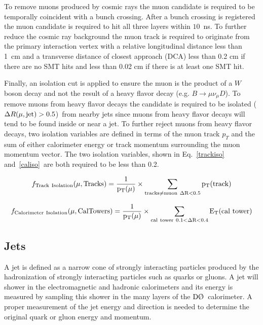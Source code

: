 To remove muons produced by cosmic rays the muon candidate is required to be temporally coincident with a bunch crossing. After a bunch crossing is registered the muon candidate is required to hit all three layers within $10$~ns. To further reduce the cosmic ray background the muon track is required to originate from the primary interaction vertex with a relative longitudinal distance less than 1~cm and a transverse distance of closest approach (DCA) less than 0.2 cm if there are no SMT hits and less than 0.02 cm if there is at least one SMT hit.

Finally, an isolation cut is applied to ensure the muon is the product of a $W$ boson decay and not the result of a heavy flavor decay (e.g. $B \rightarrow \mu\nu_{\mu} D$). To remove muons from heavy flavor decays the candidate is required to be isolated ($\Delta R(\mu,\rm{jet}) > 0.5$)~from nearby jets since muons from heavy flavor decays will tend to be found inside or near a jet. To further reject muons from heavy flavor decays, two isolation variables are defined in terms of the muon track $p_{T}$ and the sum of either calorimeter energy or track momentum surrounding the muon momentum vector. The two isolation variables, shown in Eq.~\ref{trackiso} and~\ref{caliso}~are both required to be less than 0.2.

\begin{equation}
\label{trackiso}
f_{\rm{Track~Isolation}}(\mu, \rm{Tracks}) = \frac{1}{p_{T}(\mu)} \times \sum_{\rm{tracks \neq muon~ \Delta R < 0.5 }}p_{T}(\rm{track})
\end{equation}

\begin{equation}
\label{caliso}
f_{\rm{Calorimeter~Isolation}}(\mu, \rm{CalTowers}) = \frac{1}{p_{T}(\mu)} \times \sum_{\rm{cal~tower~0.1 < \Delta R < 0.4 }}E_{T}(\rm{cal~tower})
\end{equation}


\subsection{Jets}
\label{jetreco}

A jet is defined as a narrow cone of strongly interacting particles produced by the hadronization of strongly interacting particles such as quarks or gluons. A jet will shower in the electromagnetic and hadronic calorimeters and its energy is measured by sampling this shower in the many layers of the $\dzero$~calorimeter. A proper measurement of the jet energy and direction is needed to determine the original quark or gluon energy and momentum.

